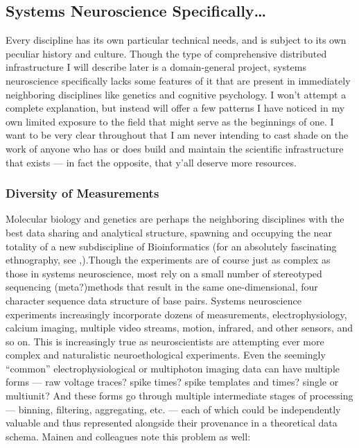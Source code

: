 \documentclass{article}
\begin{document}
\hypertarget{systems-neuroscience-specifically}{%
\subsection{Systems Neuroscience
Specifically\ldots{}}\label{systems-neuroscience-specifically}}

Every discipline has its own particular technical needs, and is subject
to its own peculiar history and culture. Though the type of
comprehensive distributed infrastructure I will describe later is a
domain-general project, systems neuroscience specifically lacks some
features of it that are present in immediately neighboring disciplines
like genetics and cognitive psychology. I won't attempt a complete
explanation, but instead will offer a few patterns I have noticed in my
own limited exposure to the field that might serve as the beginnings of
one. I want to be very clear throughout that I am never intending to
cast shade on the work of anyone who has or does build and maintain the
scientific infrastructure that exists --- in fact the opposite, that
y'all deserve more resources.

\hypertarget{diversity-of-measurements}{%
\subsubsection{Diversity of
Measurements}\label{diversity-of-measurements}}

Molecular biology and genetics are perhaps the neighboring disciplines
with the best data sharing and analytical structure, spawning and
occupying the near totality of a new subdiscipline of Bioinformatics
(for an absolutely fascinating ethnography, see \cite{bietzCollaborationMetagenomicsSequence2009},).Though the experiments
are of course just as complex as those in systems neuroscience, most
rely on a small number of stereotyped sequencing (meta?)methods that
result in the same one-dimensional, four character sequence data
structure of base pairs. Systems neuroscience experiments increasingly
incorporate dozens of measurements, electrophysiology, calcium imaging,
multiple video streams, motion, infrared, and other sensors, and so on.
This is increasingly true as neuroscientists are attempting ever more
complex and naturalistic neuroethological experiments. Even the
seemingly ``common'' electrophysiological or multiphoton imaging data
can have multiple forms --- raw voltage traces? spike times? spike
templates and times? single or multiunit? And these forms go through
multiple intermediate stages of processing --- binning, filtering,
aggregating, etc. --- each of which could be independently valuable and
thus represented alongside their provenance in a theoretical data
schema. Mainen and colleagues note this problem as well:
\end{document}
